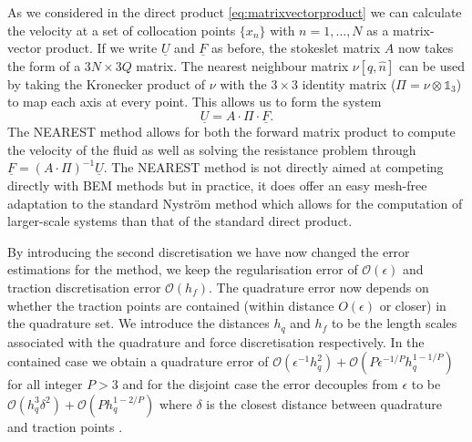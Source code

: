 As we considered in the direct product \cref{eq:matrixvectorproduct} we can calculate the velocity at a set of collocation points $\{x_n\}$ with $n=1,\dots,N$ as a matrix-vector product. If we write $\underline{U}$ and $\underline{F}$ as before, the stokeslet matrix $A$ now takes the form of a $3N \times 3Q$ matrix. The nearest neighbour matrix $\nu [q, \hat{n}]$ can be used by taking the Kronecker product of $\nu$ with the $3 \times 3$ identity matrix ($\Pi = \nu \otimes \mathds{1}_{3}$) to map each axis at every point. This allows us to form the system
\begin{equation}
    \underline{U} = A \cdot \Pi \cdot \underline{F}.
\end{equation}
The NEAREST method allows for both the forward matrix product to compute the velocity of the fluid as well as solving the resistance problem through $\underline{F} = (A \cdot \Pi)^{-1} \underline{U}$. The NEAREST method is not directly aimed at competing directly with BEM methods but in practice, it does offer an easy mesh-free adaptation to the standard Nyström method which allows for the computation of larger-scale systems than that of the standard direct product.

By introducing the second discretisation we have now changed the error estimations for the method, we keep the regularisation error of $\mathcal{O}(\epsilon)$ and traction discretisation error $\mathcal{O}(h_f)$. The quadrature error now depends on whether the traction points are contained (within distance $O(\epsilon)$ or closer) in the quadrature set. We introduce the distances $h_q$ and $h_f$ to be the length scales associated with the quadrature and force discretisation respectively. In the contained case we obtain a quadrature error of $\mathcal{O}(\epsilon^{-1}h^2_q) + \mathcal{O}(P\epsilon^{-1/P}h^{1-1/P}_q)$ for all integer $P>3$ and for the disjoint case the error decouples from $\epsilon$ to be $\mathcal{O}(h^3_q\delta^{2}) + \mathcal{O}(Ph^{1-2/P}_q)$ where $\delta$ is the closest distance between quadrature and traction points \cite{Gallagher2019SharpEquation}.

